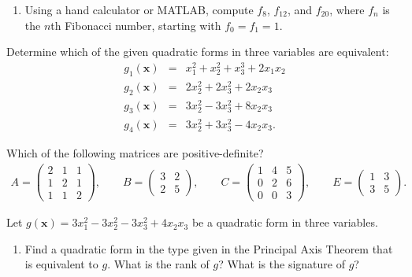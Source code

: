\documentclass[12pt]{article}
\theoremstyle{remark}
\newtheorem*{solution}{Solution}
\newcommand{\mbf}{\mathbf}
\renewcommand{\=}{&=&}
\newcommand{\<}{\langle}
\renewcommand{\>}{\rangle}
\newcommand{\bmat}{\begin{pmatrix}}
\newcommand{\emat}{\end{pmatrix}}
\newcommand{\beq}{\begin{eqnarray*}}
\newcommand{\eeq}{\end{eqnarray*}}
\begin{document}
\begin{problems}
\begin{enumerate}
	
	\item Using a hand calculator or MATLAB, compute $f_8$, $f_{12}$, and $f_{20}$, 
	where $f_n$ is the $n$th Fibonacci number, starting with $f_0 = f_1 = 1$.
	
\end{enumerate}



\item
Determine which of the given quadratic forms in three variables are equivalent:
\beq
	g_1(\mbf x) &=& x_1^2 + x_2^2+x_3^3 + 2 x_1 x_2 \\
	g_2(\mbf x) &=& 2x_2^2 + 2x_3^2 + 2 x_2 x_3 \\
	g_3(\mbf x) &=& 3x_2^2 - 3x_3^2 + 8 x_2 x_3 \\
	g_4(\mbf x) &=& 3x_2^2 + 3x_3^2 - 4 x_2 x_3.
\eeq

	



\item
Which of the following matrices are positive-definite?
\beq
	A = \bmat 2 & 1 & 1 \\ 1 & 2 & 1 \\ 1 & 1 & 2 \emat, \qquad
	B = \bmat 3 & 2 \\ 2 & 5 \emat, \qquad
	C = \bmat 1 & 4 & 5 \\ 0 & 2 & 6 \\ 0 & 0 & 3 \emat, \qquad
	E = \bmat 1 & 3 \\ 3 & 5 \emat.
\eeq

	



\item
Let $g(\mbf x) = 3x_1^2 - 3x_2^2 - 3x_3^2 + 4 x_2 x_3$ be a quadratic form in three
variables. 
\begin{enumerate}
	\item Find a quadratic form in the type given in the Principal Axis Theorem that is 
	equivalent to $g$. What is the rank of $g$? What is the signature of $g$?
	

\end{enumerate}
\end{problems}
\end{document}

